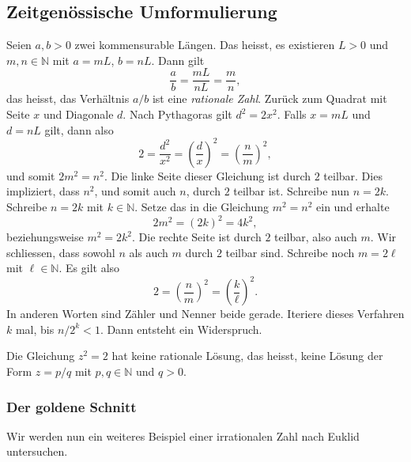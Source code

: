 \documentclass[../main.tex]{subfiles}
\begin{document}
\subsection*{Zeitgenössische Umformulierung}
Seien $a,b > 0$ zwei kommensurable Längen. Das heisst, es existieren $L > 0$
und $m,n \in \mathbb N$ mit $a = mL$, $b= nL$. Dann gilt
\[\frac{a}{b} = \frac{mL}{nL} = \frac{m}{n},\]
das heisst, das Verhältnis $a/b$ ist eine \emph{rationale Zahl}.
Zurück zum Quadrat mit Seite $x$ und Diagonale $d$. Nach Pythagoras
gilt $d^{2} = 2x^{2}$. Falls $x=mL$ und $d=nL$ gilt,
dann also
\[2 = \frac{d^{2}}{x^{2}} = {\left( \frac{d}{x}\right)}^{2} = {\left(\frac{n}{m}\right)}^{2},\]
und somit
\(
2m^{2} = n^{2}\).
Die linke Seite dieser Gleichung ist durch $2$ teilbar. Dies impliziert, dass $n^{2}$, und
somit auch $n$, durch $2$ teilbar ist. Schreibe nun $n = 2k$. Schreibe $n = 2k$ mit
$k \in \mathbb N$. Setze das in die Gleichung $m^2 = n^2$ ein und erhalte
\[
2m^{2} = {(2k)}^{2} = 4k^{2},
\]
beziehungsweise
\(m^{2} = 2k^{2}\).
Die rechte Seite ist durch $2$ teilbar, also auch $m$.
Wir schliessen, dass sowohl $n$ als auch $m$ durch $2$ teilbar sind.
Schreibe noch $m = 2\ell$ mit $\ell \in \mathbb N$. Es gilt also
\[ 2 = {\left(\frac{n}{m}\right)}^{2}
  = {\left(\frac{k}{\ell}\right)}^{2}.\]
In anderen Worten sind Zähler und Nenner beide gerade.
Iteriere dieses Verfahren $k$ mal, bis $n/2^{k} < 1$. Dann entsteht ein Widerspruch.

\begin{corollary*}
  Die Gleichung $z^{2} = 2$ hat keine rationale Lösung, das heisst,
  keine Lösung der Form $z = p/q$ mit $p, q \in \mathbb N$ und $q > 0$.
\end{corollary*}

\subsubsection*{Der goldene Schnitt}
Wir werden nun ein weiteres Beispiel
einer irrationalen Zahl nach Euklid untersuchen.
\end{document}

